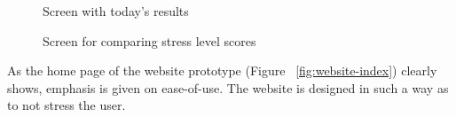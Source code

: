 \documentclass{scrartcl}
\begin{document}
\begin{figure}[htb]
	\begin{center}
			\end{center}
	\caption{Screen with today's results}
	\label{fig:website-todays-results}
\end{figure}

\begin{figure}[htb]
	\begin{center}
			\end{center}
	\caption{Screen for comparing stress level scores}
	\label{fig:website-compare-results}
\end{figure}

As the home page of the website prototype (Figure ~\ref{fig:website-index}) clearly shows, emphasis is given on ease-of-use. The website is designed in such a way as to not stress the user.
\end{document}

